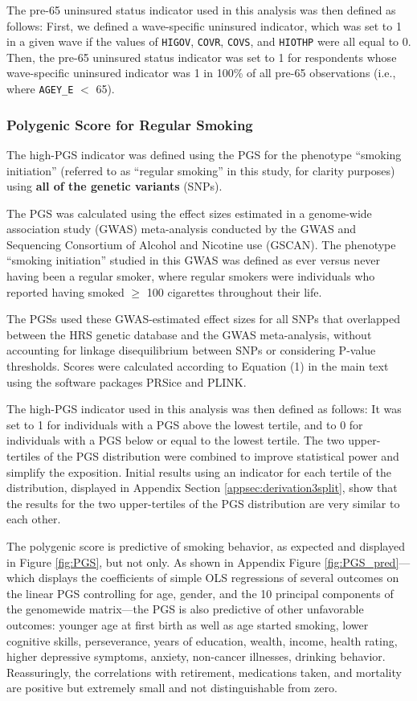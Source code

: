 The pre-65 uninsured status indicator used in this analysis was then defined as follows: First, we defined a wave-specific uninsured indicator, which was set to 1 in a given wave if the values of {\tt HIGOV}, {\tt COVR}, {\tt COVS},  and {\tt HIOTHP} were all equal to 0. Then, the pre-65 uninsured status indicator was set to 1 for respondents whose wave-specific uninsured indicator was 1 in 100\% of all pre-65 observations (i.e., where {\tt AGEY\_E} $<$ 65).\\



\subsubsection{Polygenic Score for Regular Smoking}
\label{supsec:PGS}
The high-PGS indicator was defined using the PGS for the phenotype ``smoking initiation'' (referred to as ``regular smoking'' in this study, for clarity purposes) using \textbf{all of the genetic variants} (SNPs).

The PGS was calculated using the effect sizes estimated in a genome-wide association study (GWAS) meta-analysis \cite{GSCAN2019gwas} conducted by the GWAS and Sequencing Consortium of Alcohol and Nicotine use (GSCAN).
The phenotype ``smoking initiation'' studied in this GWAS was defined as ever versus never having been a regular smoker, where regular smokers were individuals who reported having smoked $\geq$ 100 cigarettes throughout their life.

The PGSs used these GWAS-estimated effect sizes for all SNPs that overlapped between the HRS genetic database and the GWAS meta-analysis, without accounting for linkage disequilibrium between SNPs or considering P-value thresholds.
Scores were calculated according to Equation (1) in the main text using the software packages PRSice and PLINK.


The high-PGS indicator used in this analysis was then defined as follows: It was set to 1 for individuals with a PGS above the lowest tertile, and to 0 for individuals with a PGS below or equal to the lowest tertile.
The two upper-tertiles of the PGS distribution were combined to improve statistical power and simplify the exposition. Initial results using an indicator for each tertile of the distribution, displayed in Appendix Section \ref{appsec:derivation3split}, show that the results for the two upper-tertiles of the PGS distribution are very similar to each other.

The polygenic score is predictive of smoking behavior, as expected and displayed in Figure \ref{fig:PGS}, but not only.
As shown in Appendix Figure \ref{fig:PGS_pred}---which displays the coefficients of simple OLS regressions of several outcomes on the linear PGS controlling for age, gender, and the 10 principal components of the genomewide matrix---the PGS is also predictive of other unfavorable outcomes: younger age at first birth as well as age started smoking, lower cognitive skills, perseverance, years of education, wealth, income, health rating, higher depressive symptoms, anxiety, non-cancer illnesses, drinking behavior.
Reassuringly, the correlations with retirement, medications taken, and mortality are positive but extremely small and not distinguishable from zero.

